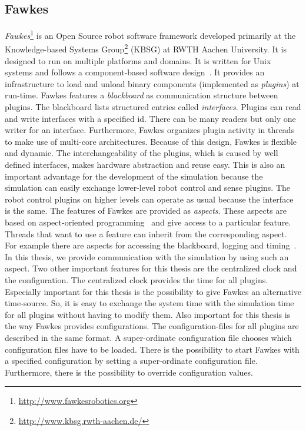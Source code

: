 \subsection{Fawkes}
\textit{Fawkes}\footnote{\url{http://www.fawkesrobotics.org}} is an Open Source robot software framework developed primarily at the Knowledge-based Systems Group\footnote{\url{http://www.kbsg.rwth-aachen.de/}} (KBSG) at RWTH Aachen University. It is designed to run on multiple platforms and domains. It is written for Unix systems and follows a component-based software design~\cite{FawkesDesign}. It provides an infrastructure to load and unload binary components (implemented as \textit{plugins}) at run-time. Fawkes features a \textit{blackboard} as communication structure between plugins. The blackboard lists structured entries called \textit{interfaces}. Plugins can read and write interfaces with a specified id. There can be many readers but only one writer for an interface. Furthermore, Fawkes organizes plugin activity in threads to make use of multi-core architectures. Because of this design, Fawkes is flexible and dynamic. The interchangeability of the plugins, which is caused by well defined interfaces, makes hardware abstraction and reuse easy. This is also an important advantage for the development of the simulation because the simulation can easily exchange lower-level robot control and sense plugins. The robot control plugins on higher levels can operate as usual because the interface is the same. The features of Fawkes are provided as \textit{aspects}. These aspects are based on aspect-oriented programming~\cite{aspect_oriented} and give access to a particular feature. Threads that want to use a feature can inherit from the corresponding aspect. For example there are aspects for accessing the blackboard, logging and timing~\cite{tnthesis}. In this thesis, we provide communication with the simulation by using such an aspect. Two other important features for this thesis are the centralized clock and the configuration. The centralized clock provides the time for all plugins. Especially important for this thesis is the possibility to give Fawkes an alternative time-source. So, it is easy to exchange the system time with the simulation time for all plugins without having to modify them. Also important for this thesis is the way Fawkes provides configurations. The configuration-files for all plugins are described in the same format. A super-ordinate configuration file chooses which configuration files have to be loaded. There is the possibility to start Fawkes with a specified configuration by setting a super-ordinate configuration file. Furthermore, there is the possibility to override configuration values.\\
